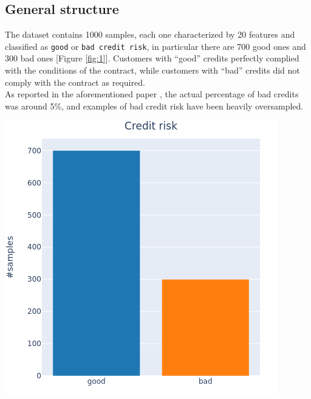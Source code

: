 \documentclass[letterpaper]{article}
\begin{document}
	\subsection{General structure}
	The dataset contains 1000 samples, each one characterized by 20 features and classified as \texttt{good} or \texttt{bad credit risk}, in particular there are 700 good ones and 300 bad ones [Figure \ref{fig:1}].  Customers with “good” credits perfectly complied with the conditions of the contract, while customers with “bad” credits did not comply with the contract as required.\\ As reported in the aforementioned paper \cite{gromping}, the actual percentage of bad credits was around 5\%, and examples of bad credit risk have been heavily oversampled. 
	
	\begin{center}
		\includegraphics[scale=.35]{images/class.png}
		\label{fig:1}
	\end{center}
	
\end{document}
